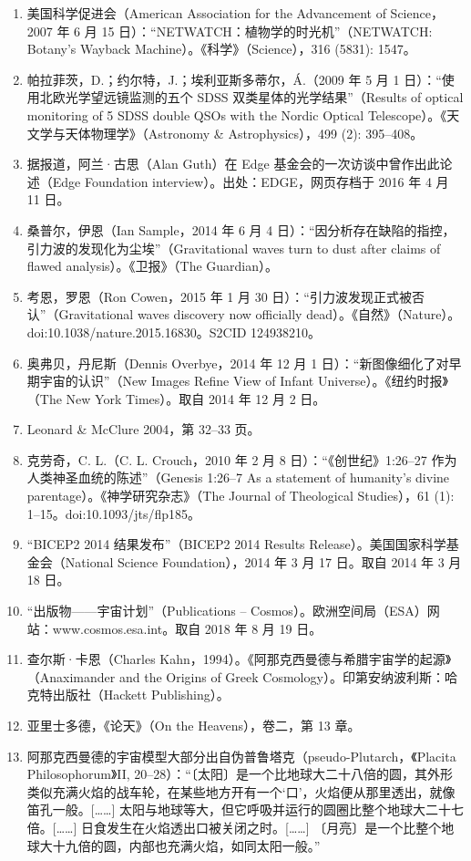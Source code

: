 \begin{enumerate}
\item 美国科学促进会（American Association for the Advancement of Science，2007 年 6 月 15 日）：“NETWATCH：植物学的时光机”（NETWATCH: Botany's Wayback Machine）。《科学》（Science），316 (5831): 1547。  
\item 帕拉菲茨，D.；约尔特，J.；埃利亚斯多蒂尔，Á.（2009 年 5 月 1 日）：“使用北欧光学望远镜监测的五个 SDSS 双类星体的光学结果”（Results of optical monitoring of 5 SDSS double QSOs with the Nordic Optical Telescope）。《天文学与天体物理学》（Astronomy & Astrophysics），499 (2): 395–408。
\item 据报道，阿兰·古思（Alan Guth）在 Edge 基金会的一次访谈中曾作出此论述（Edge Foundation interview）。出处：EDGE，网页存档于 2016 年 4 月 11 日。  
\item 桑普尔，伊恩（Ian Sample，2014 年 6 月 4 日）：“因分析存在缺陷的指控，引力波的发现化为尘埃”（Gravitational waves turn to dust after claims of flawed analysis）。《卫报》（The Guardian）。  
\item 考恩，罗恩（Ron Cowen，2015 年 1 月 30 日）：“引力波发现正式被否认”（Gravitational waves discovery now officially dead）。《自然》（Nature）。doi:10.1038/nature.2015.16830。S2CID 124938210。  
\item 奥弗贝，丹尼斯（Dennis Overbye，2014 年 12 月 1 日）：“新图像细化了对早期宇宙的认识”（New Images Refine View of Infant Universe）。《纽约时报》（The New York Times）。取自 2014 年 12 月 2 日。  
\item Leonard & McClure 2004，第 32–33 页。  
\item 克劳奇，C. L.（C. L. Crouch，2010 年 2 月 8 日）：“《创世纪》1:26–27 作为人类神圣血统的陈述”（Genesis 1:26–7 As a statement of humanity's divine parentage）。《神学研究杂志》（The Journal of Theological Studies），61 (1): 1–15。doi:10.1093/jts/flp185。  
\item “BICEP2 2014 结果发布”（BICEP2 2014 Results Release）。美国国家科学基金会（National Science Foundation），2014 年 3 月 17 日。取自 2014 年 3 月 18 日。  
\item “出版物——宇宙计划”（Publications – Cosmos）。欧洲空间局（ESA）网站：www.cosmos.esa.int。取自 2018 年 8 月 19 日。  
\item 查尔斯·卡恩（Charles Kahn，1994）。《阿那克西曼德与希腊宇宙学的起源》（Anaximander and the Origins of Greek Cosmology）。印第安纳波利斯：哈克特出版社（Hackett Publishing）。  
\item 亚里士多德，《论天》（On the Heavens），卷二，第 13 章。  
\item 阿那克西曼德的宇宙模型大部分出自伪普鲁塔克（pseudo-Plutarch，《Placita Philosophorum》II, 20–28）：“〔太阳〕是一个比地球大二十八倍的圆，其外形类似充满火焰的战车轮，在某些地方开有一个‘口’，火焰便从那里透出，就像笛孔一般。[……] 太阳与地球等大，但它呼吸并运行的圆圈比整个地球大二十七倍。[……] 日食发生在火焰透出口被关闭之时。[……] 〔月亮〕是一个比整个地球大十九倍的圆，内部也充满火焰，如同太阳一般。”

\end{enumerate}

